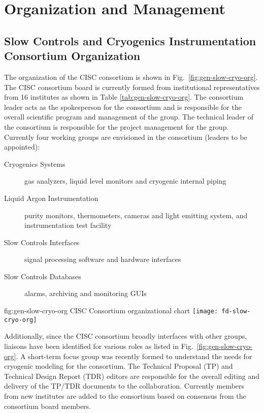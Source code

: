 \section{Organization and Management}
\label{sec:fdgen-slow-cryo-org}


\subsection{Slow Controls and Cryogenics Instrumentation Consortium Organization}
\label{sec:fdgen-slow-cryo-org-consortium}


The organization of the CISC consortium is shown in
Fig.\ \ref{fig:gen-slow-cryo-org}. The CISC consortium board is
currently formed from institutional representatives from 16 institutes
as shown in Table \ref{tab:gen-slow-cryo-org}. The consortium leader
acts as the spokesperson for the consortium and is responsible for the
overall scientific program and management of the group. The technical
leader of the consortium is responsible for the project management for
the group.  Currently four working groups are envisioned in the
consortium (leaders to be appointed):

\begin{description}
 \item[Cryogenics Systems] gas analyzers, liquid level
  monitors and cryogenic internal piping
 \item[Liquid Argon Instrumentation] purity monitors, thermometers,
  cameras and light emitting system, and instrumentation test facility
 \item[Slow Controls Interfaces] signal processing software and
  hardware interfaces
 \item[Slow Controls Databases] alarms, archiving and monitoring GUIs
\end{description}

\begin{dunefigure}{fig:gen-slow-cryo-org}
{CISC Consortium organizational chart}
\texttt{[image: fd-slow-cryo-org]}
\end{dunefigure}

Additionally, since the CISC consortium broadly interfaces with other
groups, liaisons have been identified for various roles as listed in
Fig.\ \ref{fig:gen-slow-cryo-org}. A short-term focus group was
recently formed to understand the needs for cryogenic modeling for the
consortium. The Technical Proposal (TP) and Technical Design Report
(TDR) editors are responsible for the overall editing and delivery of
the TP/TDR documents to the collaboration. Currently members from new
institutes are added to the consortium based on consensus from the
consortium board members.

